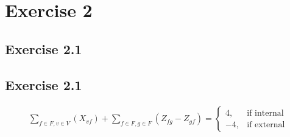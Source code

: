 \documentclass[12pt]{article}
\begin{document}
\section*{Exercise 2}
\subsection*{Exercise 2.1}

\subsection*{Exercise 2.1}
\begin{align*}
    \sum_{f \in F, v \in V}(X_{vf}) + \sum_{f \in F, g \in F}(Z_{fg}-Z_{gf}) = \begin{cases}
                                                                                     4, & \text{if internal}\\
                                                                                    -4, & \text{if external}
                                                                               \end{cases}
\end{align*}
\end{document}
